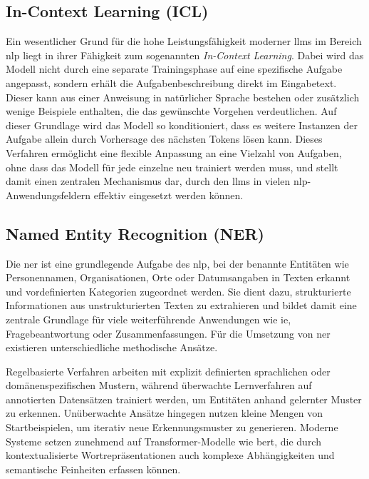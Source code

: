 
\subsection{In-Context Learning (ICL)}\label{subsec:in-context-learning}

Ein wesentlicher Grund für die hohe Leistungsfähigkeit moderner \glspl{llm} im Bereich \gls{nlp} liegt in ihrer Fähigkeit zum sogenannten \emph{In-Context Learning}.
Dabei wird das Modell nicht durch eine separate Trainingsphase auf eine spezifische Aufgabe angepasst, sondern erhält die Aufgabenbeschreibung direkt im Eingabetext.
Dieser kann aus einer Anweisung in natürlicher Sprache bestehen oder zusätzlich wenige Beispiele enthalten, die das gewünschte Vorgehen verdeutlichen.
Auf dieser Grundlage wird das Modell so konditioniert, dass es weitere Instanzen der Aufgabe allein durch Vorhersage des nächsten Tokens lösen kann.
Dieses Verfahren ermöglicht eine flexible Anpassung an eine Vielzahl von Aufgaben, ohne dass das Modell für jede einzelne neu trainiert werden muss, und stellt damit einen zentralen Mechanismus dar, durch den \glspl{llm} in vielen \gls{nlp}-Anwendungsfeldern effektiv eingesetzt werden können\autocite{brown_language_2020}.


\subsection{Named Entity Recognition (NER)}

Die \gls{ner} ist eine grundlegende Aufgabe des \gls{nlp}, bei der benannte Entitäten wie Personennamen, Organisationen, Orte oder Datumsangaben in Texten erkannt und vordefinierten Kategorien zugeordnet werden.
Sie dient dazu, strukturierte Informationen aus unstrukturierten Texten zu extrahieren und bildet damit eine zentrale Grundlage für viele weiterführende Anwendungen wie \gls{ie}, Fragebeantwortung oder Zusammenfassungen.
Für die Umsetzung von \gls{ner} existieren unterschiedliche methodische Ansätze\autocite{pakhale_comprehensive_2023}.

Regelbasierte Verfahren arbeiten mit explizit definierten sprachlichen oder domänenspezifischen Mustern, während überwachte Lernverfahren auf annotierten Datensätzen trainiert werden, um Entitäten anhand gelernter Muster zu erkennen.
Unüberwachte Ansätze hingegen nutzen kleine Mengen von Startbeispielen, um iterativ neue Erkennungsmuster zu generieren.
Moderne Systeme setzen zunehmend auf Transformer-Modelle wie \gls{bert}, die durch kontextualisierte Wortrepräsentationen auch komplexe Abhängigkeiten und semantische Feinheiten erfassen können\autocite{pakhale_comprehensive_2023}.

